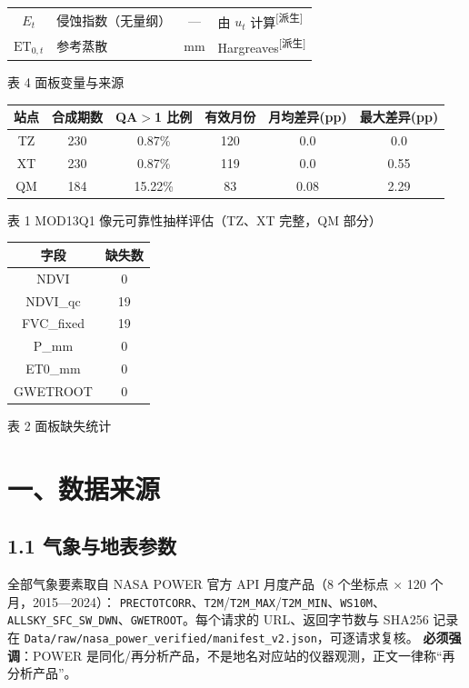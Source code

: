 \documentclass[11pt,a4paper]{ctexart}
\newcommand{\src}[1]{\textsuperscript{\scriptsize [#1]}}
\begin{document}
\begin{table}[H]
\begin{tabularx}{\textwidth}{|c|X|c|X|}
$E_t$ & 侵蚀指数（无量纲） & — & 由 $u_t$ 计算\src{派生}\\
$\mathrm{ET}_{0,t}$ & 参考蒸散 & mm & Hargreaves\src{派生}\\
\bottomrule
\end{tabularx}
\begin{center}\small 表 4  面板变量与来源\end{center}
\end{table}\begin{table}[H]\centering\small\setlength{\parskip}{1pt}
\begin{tabular}{|c|c|c|c|c|c|}
\toprule
站点 & 合成期数 & QA$>$1 比例 & 有效月份 & 月均差异(pp) & 最大差异(pp)\\
\midrule
TZ & 230 & 0.87\% & 120 & 0.0 & 0.0\\
XT & 230 & 0.87\% & 119 & 0.0 & 0.55\\
QM & 184 & 15.22\% & 83 & 0.08 & 2.29\\
\bottomrule
\end{tabular}
\begin{center}\small 表 1  MOD13Q1 像元可靠性抽样评估（TZ、XT 完整，QM 部分）\end{center}
\end{table}\begin{table}[H]\centering\small\setlength{\parskip}{1pt}
\begin{tabular}{|c|c|}
\toprule
字段 & 缺失数\\
\midrule
NDVI & 0\\
NDVI\_qc & 19\\
FVC\_fixed & 19\\
P\_mm & 0\\
ET0\_mm & 0\\
GWETROOT & 0\\
\bottomrule
\end{tabular}
\begin{center}\small 表 2  面板缺失统计\end{center}
\end{table}
\section*{一、数据来源}
\subsection*{1.1 气象与地表参数}
全部气象要素取自 NASA POWER 官方 API 月度产品（8 个坐标点 $\times$ 120 个月，2015—2024）：
\texttt{PRECTOTCORR}、\texttt{T2M}/\texttt{T2M\_MAX}/\texttt{T2M\_MIN}、\texttt{WS10M}、
\texttt{ALLSKY\_SFC\_SW\_DWN}、\texttt{GWETROOT}。每个请求的 URL、返回字节数与 SHA256
记录在 \texttt{Data/raw/nasa\_power\_verified/manifest\_v2.json}，可逐请求复核。
\textbf{必须强调}：POWER 是同化/再分析产品，不是地名对应站的仪器观测，正文一律称“再分析产品”。
\end{document}
